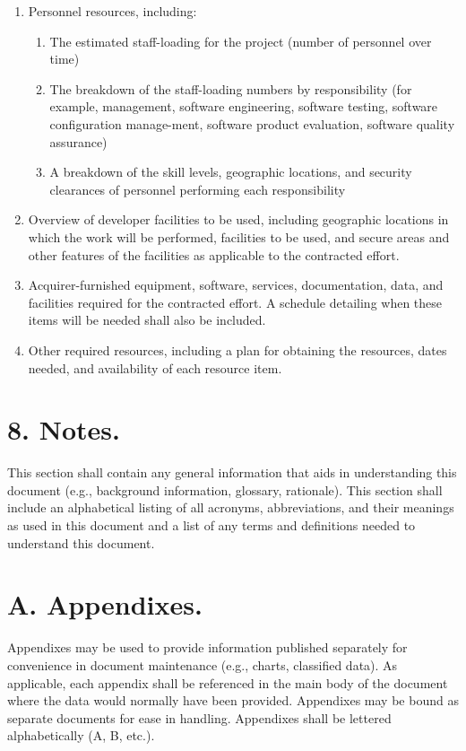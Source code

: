 \begin{enumerate}
\itemsep1pt\parskip0pt
\item
  Personnel resources, including:

  \begin{enumerate}
  \itemsep1pt\parskip0pt
  \item
    The estimated staff-loading for the project (number of personnel
    over time)
  \item
    The breakdown of the staff-loading numbers by responsibility (for
    example, management, software engineering, software testing,
    software configuration manage-ment, software product evaluation,
    software quality assurance)
  \item
    A breakdown of the skill levels, geographic locations, and security
    clearances of personnel performing each responsibility
  \end{enumerate}
\item
  Overview of developer facilities to be used, including geographic
  locations in which the work will be performed, facilities to be used,
  and secure areas and other features of the facilities as applicable to
  the contracted effort.
\item
  Acquirer-furnished equipment, software, services, documentation, data,
  and facilities required for the contracted effort. A schedule
  detailing when these items will be needed shall also be included.
\item
  Other required resources, including a plan for obtaining the
  resources, dates needed, and availability of each resource item.
\end{enumerate}

\section{8. Notes.}

This section shall contain any general information that aids in
understanding this document (e.g., background information, glossary,
rationale). This section shall include an alphabetical listing of all
acronyms, abbreviations, and their meanings as used in this document and
a list of any terms and definitions needed to understand this document.

\section{A. Appendixes.}

Appendixes may be used to provide information published separately for
convenience in document maintenance (e.g., charts, classified data). As
applicable, each appendix shall be referenced in the main body of the
document where the data would normally have been provided. Appendixes
may be bound as separate documents for ease in handling. Appendixes
shall be lettered alphabetically (A, B, etc.).
